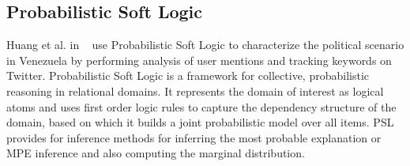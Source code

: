 \documentclass{article}
\begin{document}
\subsection{Probabilistic Soft Logic}
Huang et al. in ~\cite{huang2012social} use Probabilistic Soft Logic to characterize the political
scenario in Venezuela by performing analysis of user mentions and tracking keywords on Twitter.
Probabilistic Soft Logic is a framework for collective, probabilistic reasoning in relational
domains. It represents the domain of interest as logical atoms and uses first order logic rules
to capture the dependency structure of the domain, based on which it builds a joint 
probabilistic model over all items. PSL provides for inference methods for inferring the most
probable explanation or MPE inference and also computing the marginal distribution.


\end{document}
